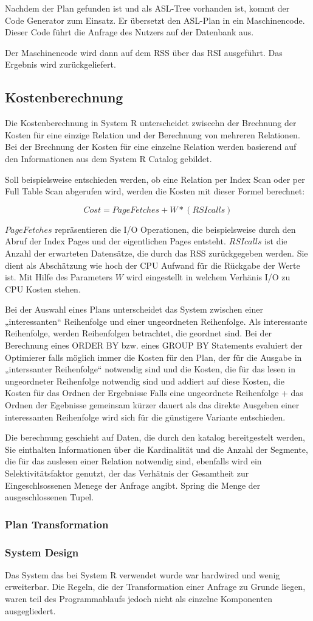 Nachdem der Plan gefunden ist und als \ac{ASL}-Tree vorhanden ist, kommt der Code Generator zum Einsatz. Er übersetzt den \ac{ASL}-Plan in ein Maschinencode. Dieser Code führt die Anfrage des Nutzers auf der Datenbank aus. 

Der Maschinencode wird dann auf dem \ac{RSS} über das \ac{RSI} ausgeführt.  Das Ergebnis wird zurückgeliefert.

\subsection{Kostenberechnung}

Die Kostenberechnung in System R unterscheidet zwiscehn der Brechnung der Kosten für eine einzige Relation und der Berechnung von mehreren Relationen. Bei der Brechnung der Kosten für eine einzelne Relation werden basierend auf den Informationen aus dem System R Catalog gebildet.

Soll beispielsweise entschieden werden, ob eine Relation per Index Scan oder per Full Table Scan abgerufen wird, werden die Kosten mit dieser Formel berechnet:

$$Cost = Page Fetches + W * (RSI calls)$$


$Page Fetches$ repräsentieren die I/O Operationen, die beispielsweise durch den Abruf der Index Pages und der eigentlichen Pages entsteht. $RSI calls$ ist die Anzahl der erwarteten Datensätze, die durch das \ac{RSS} zurückgegeben werden. Sie dient als Abschätzung wie hoch der CPU Aufwand für die Rückgabe der Werte ist. Mit Hilfe des Parameters $W$ wird eingestellt in welchem Verhänis I/O zu CPU Kosten stehen.

Bei der Auswahl eines Plans unterscheidet das System zwischen einer „interessanten“ Reihenfolge und einer ungeordneten Reihenfolge. Als interessante Reihenfolge, werden Reihenfolgen betrachtet, die geordnet sind. Bei der Berechnung eines ORDER BY bzw. eines GROUP BY Statements evaluiert der Optimierer falls möglich immer die Kosten für den Plan, der für die Ausgabe in „interssanter Reihenfolge“ notwendig sind und die Kosten, die für das lesen in ungeordneter Reihenfolge notwendig sind und addiert auf diese Kosten, die Kosten für das Ordnen der Ergebnisse Falls eine ungeordnete Reihenfolge + das Ordnen der Egebnisse gemeinsam kürzer dauert als das direkte Ausgeben einer interessanten Reihenfolge wird sich für die günstigere Variante entschieden. 

Die berechnung geschieht auf Daten, die durch den katalog bereitgestelt werden, Sie einthalten Informationen über die Kardinalität und die Anzahl der Segmente, die für das auslesen einer Relation notwendig sind, ebenfalls wird ein Selektivitätsfaktor genutzt, der das Verhätnis der Gesamtheit zur Eingeschlsossenen Menege der Anfrage angibt. Spring die Menge der ausgeschlossenen Tupel. 
\subsubsection{Plan Transformation}

\subsubsection{System Design}
Das System das bei System R verwendet wurde war hardwired und wenig erweiterbar. Die Regeln, die der Transformation einer Anfrage zu Grunde liegen, waren teil des Programmablaufs jedoch nicht als einzelne Komponenten ausgegliedert. 